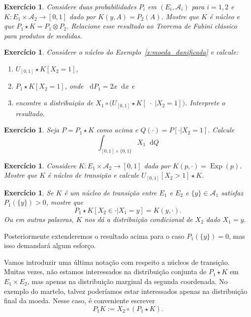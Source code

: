 \documentclass[reqno]{article}
\newcommand*\1{\mathds{1}}
\DeclareMathOperator{\Exp}{Exp}
\newtheorem{exercise}[example]{Exercício}
\renewcommand*\d{\mathop{}\!\mathrm{d}}
\begin{document}
\begin{exercise}
  Considere duas probabilidades $P_i$ em $(E_i, \mathcal{A}_i)$ para $i = 1,2$ e $K:E_1 \times \mathcal{A}_2 \to [0,1]$ dado por $K(y,A) = P_2(A)$.
  Mostre que $K$ é núcleo e que $P_1 \star K = P_1 \otimes P_2$.
  Relacione esse resultado ao Teorema de Fubini clássico para produtos de medidas.
\end{exercise}

\begin{exercise}
  Considere o núcleo do Exemplo~\ref{x:moeda_danificada} e calcule:
  \begin{enumerate}[\quad a)]
  \item $U_{[0,1]} \star K [X_2 = 1]$,
  \item $P_1 \star K [X_2 = 1]$, onde $\d P_1 = 2x \d x$ e
  \item encontre a distribuição de $X_1 \circ \big( U_{[0,1]} \star K [\; \cdot \; | X_2 = 1] \big)$. Interprete o resultado.
  \end{enumerate}
\end{exercise}

\begin{exercise}
  Seja $P = P_1 \star K$ como acima e $Q(\cdot) = P[\cdot | X_2 = 1]$.
  Calcule
  \begin{equation}
    \int_{[0,1] \times \{0,1\}} X_1 \d Q
  \end{equation}
\end{exercise}

\begin{exercise}
  Considere $K:E_1 \times \mathcal{A}_2 \to [0,1]$ dada por $K(p, \cdot) = \Exp(p)$.
  Mostre que $K$ é núcleo de transição e calcule $U_{[0,1]}[X_2 > 1] \star K$.
\end{exercise}

\begin{exercise}
  Se $K$ é um núcleo de transição entre $E_1$ e $E_2$ e $\{y\} \in \mathcal{A}_1$ satisfaz $P_1(\{y\}) > 0$, mostre que
  \begin{equation}
    P_1 \star K [X_2 \in \cdot | X_1 = y] = K(y, \cdot).
  \end{equation}
  Ou em outras palavras, $K$ nos dá a distribuição condicional de $X_2$ dado $X_1 = y$.
\end{exercise}

Posteriormente extenderemos o resultado acima para o caso $P_1(\{y\}) = 0$, mas isso demandará algum esforço.

\newpage

Vamos introduzir uma última notação com respeito a núcleos de transição.
Muitas vezes, não estamos interessados na distribuição conjunta de $P_1 \star K$ em $E_1 \times E_2$, mas apenas na distribuição marginal da segunda coordenada.
No exemplo do martelo, talvez poderíamos estar interessados apenas na distribuição final da moeda.
Nesse caso, é conveniente escrever
\begin{equation}
  \label{e:P1_K}
  P_1 K := X_2 \circ (P_1 \star K).
\end{equation}
\end{document}
